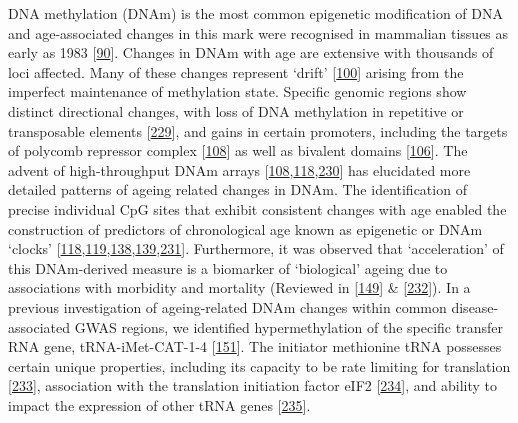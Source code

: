 \documentclass[
]{book}
\begin{document}
DNA methylation (DNAm) is the most common epigenetic modification of DNA and age-associated changes in this mark were recognised in mammalian tissues as early as 1983 {[}\protect\hyperlink{ref-Wilson1983}{90}{]}.
Changes in DNAm with age are extensive with thousands of loci affected.
Many of these changes represent `drift' {[}\protect\hyperlink{ref-Fraga2005}{100}{]} arising from the imperfect maintenance of methylation state.
Specific genomic regions show distinct directional changes, with loss of DNA methylation in repetitive or transposable elements {[}\protect\hyperlink{ref-Chuong2017}{229}{]}, and gains in certain promoters, including the targets of polycomb repressor complex {[}\protect\hyperlink{ref-Teschendorff2010}{108}{]} as well as bivalent domains {[}\protect\hyperlink{ref-Rakyan2010}{106}{]}.
The advent of high-throughput DNAm arrays {[}\protect\hyperlink{ref-Teschendorff2010}{108},\protect\hyperlink{ref-Hannum2013}{118},\protect\hyperlink{ref-Sandoval2011}{230}{]} has elucidated more detailed patterns of ageing related changes in DNAm.
The identification of precise individual CpG sites that exhibit consistent changes with age enabled the construction of predictors of chronological age known as epigenetic or DNAm `clocks' {[}\protect\hyperlink{ref-Hannum2013}{118},\protect\hyperlink{ref-Horvath2013}{119},\protect\hyperlink{ref-Levine2018}{138},\protect\hyperlink{ref-Lu2019}{139},\protect\hyperlink{ref-Horvath2018a}{231}{]}.
Furthermore, it was observed that `acceleration' of this DNAm-derived measure is a biomarker of `biological' ageing due to associations with morbidity and mortality (Reviewed in {[}\protect\hyperlink{ref-Horvath2018}{149}{]} \& {[}\protect\hyperlink{ref-Field2018}{232}{]}).
In a previous investigation of ageing-related DNAm changes within common disease-associated GWAS regions, we identified hypermethylation of the specific transfer RNA gene, tRNA-iMet-CAT-1-4 {[}\protect\hyperlink{ref-Bell2016}{151}{]}.
The initiator methionine tRNA possesses certain unique properties, including its capacity to be rate limiting for translation {[}\protect\hyperlink{ref-Rideout2012}{233}{]}, association with the translation initiation factor eIF2 {[}\protect\hyperlink{ref-Kolitz2010}{234}{]}, and ability to impact the expression of other tRNA genes {[}\protect\hyperlink{ref-Pavon-Eternod2013}{235}{]}.
\end{document}
